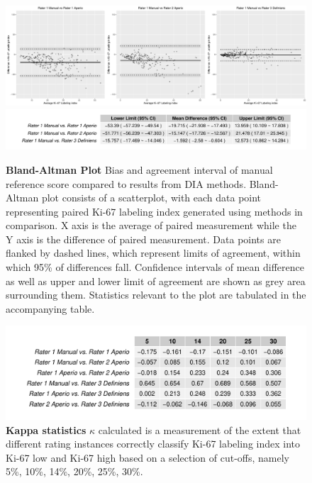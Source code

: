 \documentclass[final,5p,times,twocolumn]{elsarticle}
\begin{document}
\begin{figure}
\includegraphics[width = \linewidth]{baplot}
\includegraphics[width = \linewidth]{baStat}

\centering
\caption{{\bf Bland-Altman Plot}
Bias and agreement interval of manual reference score compared to results from DIA methods. Bland-Altman plot consists of a scatterplot, with each data point representing paired Ki-67 labeling index generated using methods in comparison. X axis is the average of paired measurement while the Y axis is the difference of paired measurement. Data points are flanked by dashed lines, which represent limits of agreement, within which 95\% of differences fall. Confidence intervals of mean difference as well as upper and lower limit of agreement are shown as grey area surrounding them. Statistics relevant to the plot are tabulated in the accompanying table.
}
\label{baplot}
\end{figure}


\begin{figure}
\includegraphics[width = \linewidth]{kappaStat}
\centering
\caption{{\bf Kappa statistics }
$\kappa$ calculated is a measurement of the extent that different rating instances correctly classify Ki-67 labeling index into Ki-67 low and Ki-67 high based on a selection of cut-offs, namely 5\%, 10\%, 14\%, 20\%, 25\%, 30\%.
}
\label{kappaStat}
\end{figure}
\end{document}
